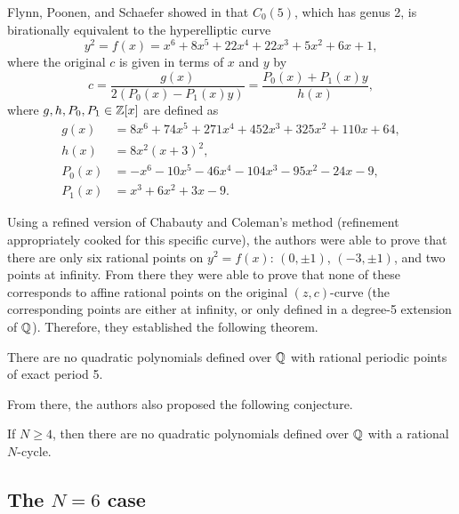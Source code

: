 Flynn, Poonen, and Schaefer showed in \cite{MR1480542} that $C_0(5)$,
which has genus 2, is birationally equivalent to the hyperelliptic
curve
\begin{equation}
  \label{eq:c0(5)}
  y^2 = f(x) = x^6 + 8x^5 + 22x^4 + 22x^3 + 5x^2 + 6x + 1,
\end{equation}
where the original $c$ is given in terms of $x$ and $y$ by
\begin{equation}
  \label{eq:c-in-xy}
  c = \frac{g(x)}{2(P_0(x) - P_1(x) y)}
  = \frac{P_0(x) + P_1(x) y}{h(x)},
\end{equation}
where $g, h, P_0, P_1 \in \mathbb{Z}[x]$ are defined as
\begin{subequations}
  \label{eq:poly-defs}
  \begin{align}
    g(x) & = 8x^6 + 74x^5 + 271x^4 + 452x^3 + 325x^2 + 110x + 64,\\
    h(x) & = 8x^2(x+3)^2,\\
    P_0(x) & = - x^6 - 10x^5 - 46x^4 - 104x^3 - 95x^2 - 24x - 9,\\
    P_1(x) & = x^3 + 6x^2 + 3x - 9.
  \end{align}
\end{subequations}

Using a refined version of Chabauty and Coleman's method (refinement
appropriately cooked for this specific curve), the authors were able
to prove that there are only six rational points on $y^2 = f(x)$: $(0,
\pm 1)$, $(-3, \pm 1)$, and two points at infinity. From there they
were able to prove that none of these corresponds to affine rational
points on the original $(z, c)$-curve (the corresponding points are
either at infinity, or only defined in a degree-5 extension of $\mathbb{Q}$).
Therefore, they established the following theorem.

\begin{theorem}
  There are no quadratic polynomials defined over $\mathbb{Q}$ with rational
  periodic points of exact period 5.
\end{theorem}

From there, the authors also proposed the following conjecture.

\begin{conjecture}
  If $N \ge 4$, then there are no quadratic polynomials defined over
  $\mathbb{Q}$ with a rational $N$-cycle.
\end{conjecture}

\subsection{The $N = 6$ case}
\label{subsec:model-6}


